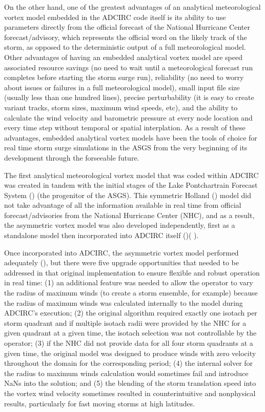 \documentclass[jmse,article,submit,moreauthors,pdftex,12pt,a4paper]{mdpi}
\begin{document}
On the other hand, one of the greatest advantages of an analytical 
meteorological vortex model embedded in the ADCIRC code itself is 
its ability to use parameters directly from the official forecast of 
the National Hurricane Center forecast/advisory, which represents 
the official word on the likely track of the storm, as opposed to 
the deterministic output of a full meteorological model. Other 
advantages of having an embedded analytical vortex model are speed 
associated resource savings (no need to wait until a meteorological 
forecast run completes before starting the storm surge run), 
reliability (no need to worry about issues or failures in a full 
meteorological model), small input file size (usually less than one 
hundred lines), precise perturbability (it is easy to create variant 
tracks, storm sizes, maximum wind speeds, etc), and the ability to 
calculate the wind velocity and barometric pressure at every node 
location and every time step without temporal or spatial 
interplation. As a result of these advantages, embedded analytical 
vortex models have been the tools of choice for real time storm 
surge simulations in the ASGS from the very beginning of its 
development through the forseeable future.  

The first analytical meteorological vortex model that was coded 
within ADCIRC was created in tandem with the initial stages of the 
Lake Pontchartrain Forecast System (\cite{FlemingJG2008}) (the 
progenitor of the ASGS). This symmetric Holland (\cite 
{HollandGJ1980}) model did not take advantage of all the information 
available in real time from official forecast/advisories from the 
National Hurricane Center (NHC), and as a result, the asymmetric 
vortex model was also developed independently, first as a standalone 
model then incorporated into ADCIRC itself (\cite{MattocksC2006})(
\cite{MattocksC2008}). 

Once incorporated into ADCIRC, the asymmetric vortex model performed 
adequately (\cite{ForbesC2010}), but there were five upgrade 
opportunities that needed to be addressed in that original 
implementation to ensure flexible and robust operation in real time: 
(1) an additional feature was needed to allow the operator to vary 
the radius of maximum winds (to create a storm ensemble, for 
example) because the radius of maximum winds was calculated 
internally to the model during ADCIRC's execution; (2) the original 
algorithm required exactly one isotach per storm quadrant and if 
multiple isotach radii were provided by the NHC for a given quadrant 
at a given time, the isotach selection was not controllable by the 
operator; (3) if the NHC did not provide data for all four storm 
quadrants at a given time, the original model was designed to 
produce winds with zero velocity throughout the domain for the 
corresponding period; (4) the internal solver for the radius to 
maximum winds calculation would sometimes fail and introduce NaNs 
into the solution; and (5) the blending of the storm translation 
speed into the vortex wind velocity sometimes resulted in 
counterintuitive and nonphysical results, particularly for fast 
moving storms at high latitudes.
\end{document}
